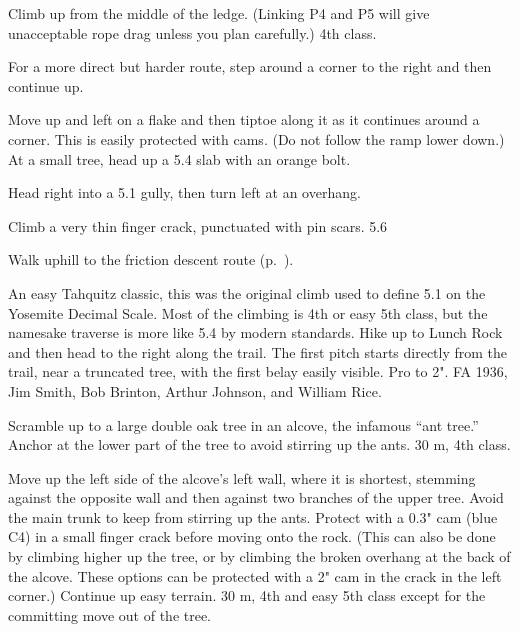 \documentclass{tahquitz}
\begin{document}

 Climb up from the middle of the ledge. (Linking P4 and P5 will
give unacceptable rope drag unless you plan carefully.) 4th class.

 For a more direct but harder route, step around a corner
to the right and then continue up.

 Move up and left on a flake
and then tiptoe along it as it continues around a corner.
This is easily protected with cams. (Do not follow the ramp lower down.) At a small
tree, head up a 5.4 slab with an orange bolt.

 Head right into a 5.1 gully, then turn left at an overhang.

 Climb a very thin finger crack, punctuated with pin scars. 5.6

Walk uphill to the friction descent route  (p.~\pageref{subsec:friction-descent}).



An easy Tahquitz classic, this was the original climb used to define
5.1 on the Yosemite Decimal Scale. Most of the
climbing is 4th or easy 5th class, but the namesake traverse is more
like 5.4 by modern standards. Hike up to Lunch Rock and then head to the right along the
trail. The first pitch starts directly from the trail, near a 
truncated tree, with the first belay easily visible. Pro to 2". FA
1936, Jim Smith, Bob Brinton, Arthur Johnson, and William Rice.

 Scramble up to a large double oak tree in an alcove, the infamous
``ant tree.'' Anchor at the lower part of the tree to avoid stirring up
the ants. 30 m, 4th class.

 Move up the left side of the alcove's left wall, where it is
shortest, stemming against the opposite wall and then against two  branches
of the upper tree. Avoid the main trunk to keep from stirring up the ants.
Protect with a 0.3" cam (blue C4) in a small
finger crack before moving onto the rock. (This can also be done by
climbing higher up the tree, or by climbing the broken overhang at
the back of the alcove. These options can be protected with a 2" cam
in the crack in the left corner.) Continue up easy terrain. 30 m, 4th and easy 5th class
except for the committing move out of the tree.
\end{document}
